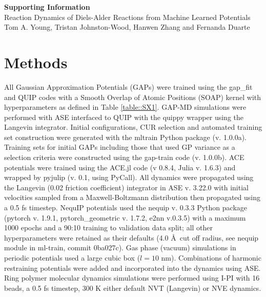 \documentclass[11pt]{article}
\numberwithin{equation}{subsection}
\begin{document}
	
\begin{titlepage}
	\vspace*{\fill}
	\begin{center}
		{\huge \bfseries{Supporting Information}}\\
		\vspace{0.2cm}
		{\huge Reaction Dynamics of Diels-Alder Reactions from Machine Learned Potentials}\\
		\vspace{0.2cm}
		{Tom A. Young, Tristan Johnston-Wood, Hanwen Zhang and Fernanda Duarte}
	\end{center}
	\vspace*{\fill}

\end{titlepage}	
\newpage

\tableofcontents
\clearpage


\section{Methods} \label{section::SI_methods}

All Gaussian Approximation Potentials (GAPs) were trained using the gap\_fit and QUIP codes with a Smooth Overlap of Atomic Positions (SOAP)\cite{Bartk2013} kernel with hyperparameters as defined in Table \ref{table::SX1}. GAP-MD simulations were performed with ASE\cite{HjorthLarsen2017} interfaced to QUIP with the quippy wrapper using the Langevin integrator. Initial configurations, CUR\cite{Mahoney2009} selection and automated training set construction were generated with the mltrain Python package (v. 1.0.0a).\cite{Young2021mlt} Training sets for initial GAPs including those that used GP variance as a selection criteria were constructed using the gap-train code (v. 1.0.0b).\cite{Young2021gt} ACE\cite{Kovacs2021, Drautz2019} potentials were trained using the ACE.jl code\cite{Ortner_ACE} (v 0.8.4, Julia v. 1.6.3) and wrapped by pyjulip (v. 0.1, using PyCall). All dynamics were propagated using the Langevin (0.02 friction coefficient) integrator in ASE v. 3.22.0 with initial velocities sampled from a Maxwell-Boltzmann distribution then propagated using a 0.5 fs timestep. NequIP\cite{Batzner2021} potentials used the nequip\cite{nequip_github} v. 0.3.3 Python package (pytorch v. 1.9.1, pytorch\_geometric v. 1.7.2, e2nn\cite{e3nn} v.0.3.5) with a maximum 1000 epochs and a 90:10 training to validation data split; all other hyperparameters were retained as their defaults (4.0 \AA~cut off radius, see nequip module in ml-train, commit 0ba027c). Gas phase (vacuum) simulations in periodic potentials used a large cubic box ($l = 10$ nm). Combinations of harmonic restraining potentials were added and incorporated into the dynamics using ASE. Ring polymer molecular dynamics simulations were performed using I-PI\cite{Kapil2019} with 16 beads, a 0.5 fs timestep, 300 K either default NVT (Langevin) or NVE dynamics. 
\end{document}
